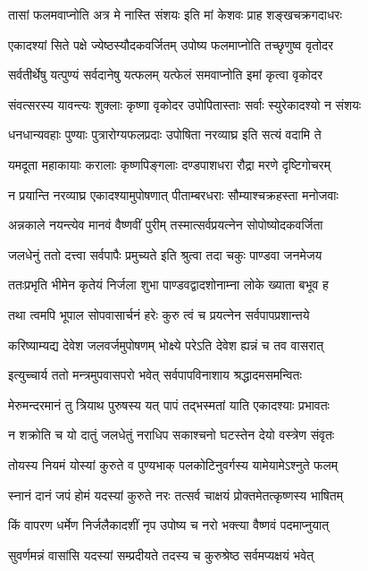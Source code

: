 \twolineshloka
{तासां फलमवाप्नोति अत्र मे नास्ति संशयः}
{इति मां केशवः प्राह शङ्खचक्रगदाधरः} %

\twolineshloka
{एकादश्यां सिते पक्षे ज्येष्ठस्यौदकवर्जितम्}
{उपोष्य फलमाप्नोति तच्छृणुष्व वृतोदर} %

\twolineshloka
{सर्वतीर्थेषु यत्पुण्यं सर्वदानेषु यत्फलम्}
{यत्फेलं समवाप्नोति इमां कृत्वा वृकोदर} %

\twolineshloka
{संवत्सरस्य यावन्त्यः शुक्लाः कृष्णा वृकोदर}
{उपोपितास्ताः सर्वाः स्युरेकादश्यो न संशयः} %

\twolineshloka
{धनधान्यवहाः पुण्याः पुत्रारोग्यफलप्रदाः}
{उपोषिता नरव्याघ्र इति सत्यं वदामि ते} %

\twolineshloka
{यमदूता महाकायाः करालाः कृष्णपिङ्गलाः}
{दण्डपाशधरा रौद्रा मरणे दृष्टिगोचरम्} %

\twolineshloka
{न प्रयान्ति नरव्याघ्र एकादश्यामुपोषणात्}
{पीताम्बरधराः सौम्याश्चक्रहस्ता मनोजवाः} %

\twolineshloka
{अन्नकाले नयन्त्येव मानवं वैष्णवीं पुरीम्}
{तस्मात्सर्वप्रयत्नेन सोपोष्योदकवर्जिता} %

\twolineshloka
{जलधेनुं ततो दत्त्वा सर्वपापैः प्रमुच्यते}
{इति श्रुत्वा तदा चकुः पाण्डवा जनमेजय} %

\twolineshloka
{ततःप्रभृति भीमेन कृतेयं निर्जला शुभा}
{पाण्डवद्वादशोनाम्ना लोके ख्याता बभूव ह} %

\twolineshloka
{तथा त्वमपि भूपाल सोपवासार्चनं हरेः}
{कुरु त्वं च प्रयत्नेन सर्वपापप्रशान्तये} %

\twolineshloka
{करिष्याम्यद्य देवेश जलवर्जमुपोषणम्}
{भोक्ष्ये परेऽति देवेश ह्यन्नं च तव वासरात्} %

\twolineshloka
{इत्युच्चार्य ततो मन्त्रमुपवासपरो भवेत्}
{सर्वपापविनाशाय श्रद्धादमसमन्वितः} %

\twolineshloka
{मेरुमन्दरमानं तु त्रियाथ पुरुषस्य यत्}
{पापं तद्भस्मतां याति एकादश्याः प्रभावतः} %

\twolineshloka
{न शक्रोति च यो दातुं जलधेतुं नराधिप}
{सकाश्चनो घटस्तेन देयो वस्त्रेण संवृतः} %

\twolineshloka
{तोयस्य नियमं योस्यां कुरुते व पुण्यभाक्}
{पलकोटिनुवर्गस्य यामेयामेऽश्नुते फलम्} %

\twolineshloka
{स्नानं दानं जपं होमं यदस्यां कुरुते नरः}
{तत्सर्व चाक्षयं प्रोक्तमेतत्कृष्णस्य भाषितम्} %

\twolineshloka
{किं वापरण धर्मेण निर्जलैकादशीं नृप}
{उपोष्य च नरो भक्त्या वैष्णवं पदमाप्नुयात्} %

\twolineshloka
{सुवर्णमन्नं वासांसि यदस्यां सम्प्रदीयते}
{तदस्य च कुरुश्रेष्ठ सर्वमप्यक्षयं भवेत्} %

